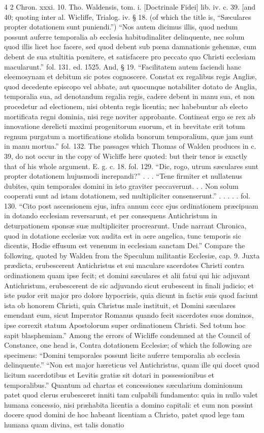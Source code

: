 4
2 Chron. xxxi. 10. Tho. Waldensis, tom. i. [Doctrinale Fidei] lib. iv. c. 39. [and 40; quoting inter al. Wicliffe, Trialog. iv. § 18. (of which the title is, “Sæculares propter dotationem sunt puniendi.”) “Nos autem dicimus illis, quod nedum possunt auferre temporalia ab ecclesia habitudinaliter delinquente, nec solum quod illis licet hoc facere, sed quod debent sub pœna damnationis gehennæ, cum debent de sua stultitia pœnitere, et satisfacere pro peccato quo Christi ecclesiam macularunt.” fol. 131. ed. 1525. And, § 19. “Facilitatem autem faciendi hanc eleemosynam et debitum sic potes cognoscere. Constat ex regalibus regis Angliæ, quod decedente episcopo vel abbate, aut quocunque notabiliter dotato de Anglia, temporalia sua, ad denotandum regalia regis, cadere debent in manu sua, et non procedetur ad electionem, nisi obtenta regis licentia; nec habebuntur ab electo mortificata regni dominia, nisi rege noviter approbante. Contineat ergo se rex ab innovatione derelicti maximi progenitorum suorum, et in brevitate erit totum regnum purgatum a mortificatione stolida bonorum temporalium, quæ jam sunt in manu mortua.” fol. 132. The passages which Thomas of Walden produces in c. 39, do not occur in the copy of Wicliffe here quoted: but their tenor is exactly that of his whole argument. E. g. c. 18. fol. 129. “Dic, rogo, utrum sæculares sunt propter dotationem hujusmodi increpandi?” . . . “Tene firmiter et nullatenus dubites, quin temporales domini in isto graviter peccaverunt. . . Non solum cooperati sunt ad istam dotationem, sed multipliciter consenserunt.” . . . . . fol. 130. “Cito post ascensionem ejus, infra annum cccc ejus ordinationem præcipuam in dotando ecclesiam reversarunt, et per consequens Antichristum in deturpationem sponsæ suæ multipliciter procrearunt. Unde narrant Chronica, quod in dotatione ecclesiæ vox audita est in aere angelica, tunc temporis sic dicentis, Hodie effusum est venenum in ecclesiam sanctam Dei.” Compare the following, quoted by Walden from the Speculum militantis Ecclesiæ, cap. 9. Juxta prædicta, erubescerent Antichristus et sui maculare sacerdotes Christi contra ordinationem quam ipse fecit; et domini sæculares et alii fatui qui hic adjuvant Antichristum, erubescerent de sic adjuvando sicut erubescent in finali judicio; et iste pudor erit major pro dolore hypocrisis, quia dicunt in factis suis quod faciunt ista ob honorem Christi, quia Christus male instituit, et Domini sæculares emendant eum, sicut Imperator Romanus quando fecit sacerdotes suos dominos, ipse correxit statum Apostolorum super ordinationem Christi. Sed totum hoc sapit blasphemiam.” Among the errors of Wicliffe condemned at the Council of Constance, one head is, Contra dotationem Ecclesiæ; of which the following are specimens: “Domini temporales possunt licite auferre temporalia ab ecclesia delinquente.” “Non est major hæreticus vel Antichristus, quam ille qui docet quod licitum sacerdotibus et Levitis gratiæ sit dotari in possessionibus et temporalibus.” Quantum ad chartas et concessiones sæcularium dominionum patet quod clerus erubesceret inniti tam culpabili fundamento: quia in nullo valet humana concessio, nisi præhabita licentia a domino capitali: et cum non possint docere quod domini de hoc habeant licentiam a Christo, patet quod lege tam humana quam divina, est talis donatio 